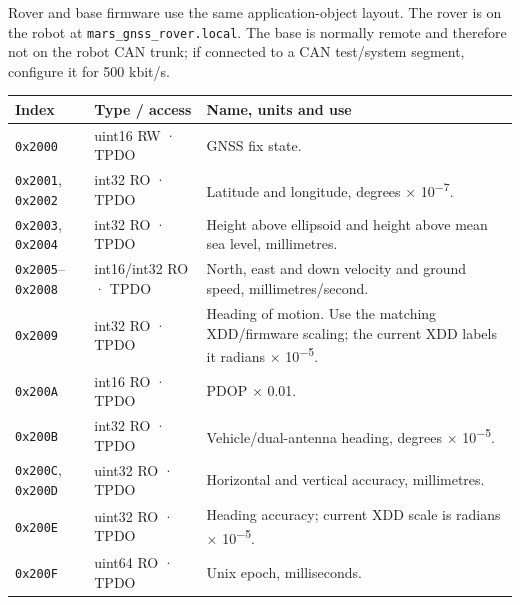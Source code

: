 \documentclass[
  10pt,
  letterpaper,
  openany]{report}
\newcounter{none} %
\begin{document}
Rover and base firmware use the same application-object layout. The
rover is on the robot at \texttt{mars\_gnss\_rover.local}. The base is
normally remote and therefore not on the robot CAN trunk; if connected
to a CAN test/system segment, configure it for 500 kbit/s.

{\def\LTcaptype{none} %
\begin{longtable}[]{@{}
  >{\raggedright\arraybackslash}p{}
  >{\raggedright\arraybackslash}p{}
  >{\raggedright\arraybackslash}p{}@{}}
\toprule\noalign{}
\begin{minipage}[b]{\linewidth}\raggedright
Index
\end{minipage} & \begin{minipage}[b]{\linewidth}\raggedright
Type / access
\end{minipage} & \begin{minipage}[b]{\linewidth}\raggedright
Name, units and use
\end{minipage} \\
\midrule\noalign{}
\endhead
\bottomrule\noalign{}
\endlastfoot
\texttt{0x2000} & uint16 RW · TPDO & GNSS fix state. \\
\texttt{0x2001}, \texttt{0x2002} & int32 RO · TPDO & Latitude and
longitude, degrees × 10\textsuperscript{−7}. \\
\texttt{0x2003}, \texttt{0x2004} & int32 RO · TPDO & Height above
ellipsoid and height above mean sea level, millimetres. \\
\texttt{0x2005}--\texttt{0x2008} & int16/int32 RO · TPDO & North, east
and down velocity and ground speed, millimetres/second. \\
\texttt{0x2009} & int32 RO · TPDO & Heading of motion. Use the matching
XDD/firmware scaling; the current XDD labels it radians ×
10\textsuperscript{−5}. \\
\texttt{0x200A} & int16 RO · TPDO & PDOP × 0.01. \\
\texttt{0x200B} & int32 RO · TPDO & Vehicle/dual-antenna heading,
degrees × 10\textsuperscript{−5}. \\
\texttt{0x200C}, \texttt{0x200D} & uint32 RO · TPDO & Horizontal and
vertical accuracy, millimetres. \\
\texttt{0x200E} & uint32 RO · TPDO & Heading accuracy; current XDD scale
is radians × 10\textsuperscript{−5}. \\
\texttt{0x200F} & uint64 RO · TPDO & Unix epoch, milliseconds. \\

\end{longtable}}
\end{document}
